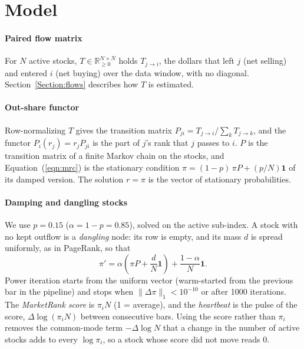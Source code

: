 \documentclass[preprint,3p,twocolumn]{elsarticle}
\begin{document}
\section{Model}
\label{Section:model}

\paragraph{Paired flow matrix} For $N$ active stocks, $T\in\mathbb{R}_{\ge 0}^{N\times N}$ holds $T_{j\to i}$, the dollars that left $j$ (net selling) and entered $i$ (net buying) over the data window, with no diagonal. Section~\ref{Section:flows} describes how $T$ is estimated.

\paragraph{Out-share functor} Row-normalizing $T$ gives the transition matrix $P_{j i}=T_{j\to i}/\sum_k T_{j\to k}$, and the functor $P_i(r_j)=r_j P_{ji}$ is the part of $j$'s rank that $j$ passes to $i$. $P$ is the transition matrix of a finite Markov chain on the stocks, and Equation~(\ref{eqn:mrc}) is the stationary condition $\pi=(1-p)\,\pi P+(p/N)\mathbf{1}$ of its damped version. The solution $r=\pi$ is the vector of stationary probabilities.

\paragraph{Damping and dangling stocks} We use $p=0.15$ ($\alpha=1-p=0.85$), solved on the active sub-index. A stock with no kept outflow is a \emph{dangling} node: its row is empty, and its mass $d$ is spread uniformly, as in PageRank, so that
\begin{equation}
\pi'=\alpha\left(\pi P+\frac{d}{N}\mathbf{1}\right)+\frac{1-\alpha}{N}\mathbf{1}.
\end{equation}
Power iteration starts from the uniform vector (warm-started from the previous bar in the pipeline) and stops when $\lVert\Delta\pi\rVert_1<10^{-10}$ or after 1000 iterations. The \emph{MarketRank score} is $\pi_i N$ (1 = average), and the \emph{heartbeat} is the pulse of the score, $\Delta\log(\pi_i N)$ between consecutive bars. Using the score rather than $\pi_i$ removes the common-mode term $-\Delta\log N$ that a change in the number of active stocks adds to every $\log\pi_i$, so a stock whose score did not move reads 0.
\end{document}
